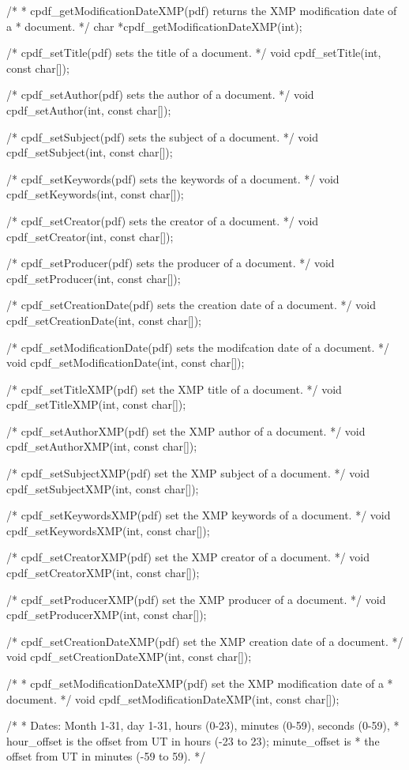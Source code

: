 /*
 * cpdf_getModificationDateXMP(pdf) returns the XMP modification date of a
 * document.
 */
char *cpdf_getModificationDateXMP(int);

/* cpdf_setTitle(pdf) sets the title of a document. */
void cpdf_setTitle(int, const char[]);

/* cpdf_setAuthor(pdf) sets the author of a document. */
void cpdf_setAuthor(int, const char[]);

/* cpdf_setSubject(pdf) sets the subject of a document. */
void cpdf_setSubject(int, const char[]);

/* cpdf_setKeywords(pdf) sets the keywords of a document. */
void cpdf_setKeywords(int, const char[]);

/* cpdf_setCreator(pdf) sets the creator of a document. */
void cpdf_setCreator(int, const char[]);

/* cpdf_setProducer(pdf) sets the producer of a document. */
void cpdf_setProducer(int, const char[]);

/* cpdf_setCreationDate(pdf) sets the creation date of a document. */
void cpdf_setCreationDate(int, const char[]);

/* cpdf_setModificationDate(pdf) sets the modifcation date of a document. */
void cpdf_setModificationDate(int, const char[]);

/* cpdf_setTitleXMP(pdf) set the XMP title of a document. */
void cpdf_setTitleXMP(int, const char[]);

/* cpdf_setAuthorXMP(pdf) set the XMP author of a document. */
void cpdf_setAuthorXMP(int, const char[]);

/* cpdf_setSubjectXMP(pdf) set the XMP subject of a document. */
void cpdf_setSubjectXMP(int, const char[]);

/* cpdf_setKeywordsXMP(pdf) set the XMP keywords of a document. */
void cpdf_setKeywordsXMP(int, const char[]);

/* cpdf_setCreatorXMP(pdf) set the XMP creator of a document. */
void cpdf_setCreatorXMP(int, const char[]);

/* cpdf_setProducerXMP(pdf) set the XMP producer of a document. */
void cpdf_setProducerXMP(int, const char[]);

/* cpdf_setCreationDateXMP(pdf) set the XMP creation date of a document. */
void cpdf_setCreationDateXMP(int, const char[]);

/*
 * cpdf_setModificationDateXMP(pdf) set the XMP modification date of a
 * document.
 */
void cpdf_setModificationDateXMP(int, const char[]);

/*
 * Dates: Month 1-31, day 1-31, hours (0-23), minutes (0-59), seconds (0-59),
 * hour_offset is the offset from UT in hours (-23 to 23); minute_offset is
 * the offset from UT in minutes (-59 to 59).
 */

